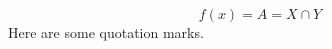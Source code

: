 \documentclass{article}
\begin{document}
\[
f(x) = 
A = X \cap Y
\]
Here are some quotation marks.
\end{document}
